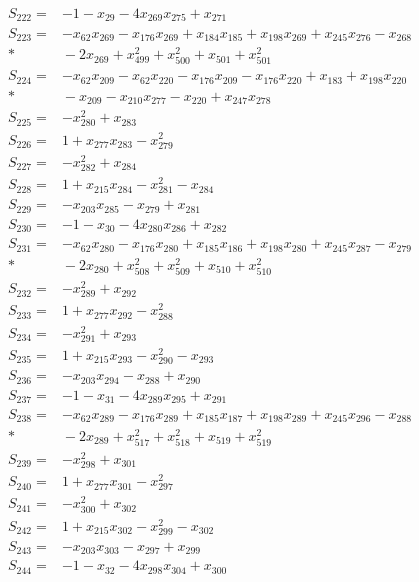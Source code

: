 \begin{align*}
S_{222}={}&-1-x_{29}-4x_{269}x_{275}+x_{271}\\[3pt]
S_{223}={}&-x_{62}x_{269}-x_{176}x_{269}+x_{184}x_{185}+x_{198}x_{269}+x_{245}x_{276}-x_{268}\\*
&{}-2x_{269}+x_{499}^{2}+x_{500}^{2}+x_{501}+x_{501}^{2}\\[3pt]
S_{224}={}&-x_{62}x_{209}-x_{62}x_{220}-x_{176}x_{209}-x_{176}x_{220}+x_{183}+x_{198}x_{220}\\*
&{}-x_{209}-x_{210}x_{277}-x_{220}+x_{247}x_{278}\\[3pt]
S_{225}={}&-x_{280}^{2}+x_{283}\\[3pt]
S_{226}={}&1+x_{277}x_{283}-x_{279}^{2}\\[3pt]
S_{227}={}&-x_{282}^{2}+x_{284}\\[3pt]
S_{228}={}&1+x_{215}x_{284}-x_{281}^{2}-x_{284}\\[3pt]
S_{229}={}&-x_{203}x_{285}-x_{279}+x_{281}\\[3pt]
S_{230}={}&-1-x_{30}-4x_{280}x_{286}+x_{282}\\[3pt]
S_{231}={}&-x_{62}x_{280}-x_{176}x_{280}+x_{185}x_{186}+x_{198}x_{280}+x_{245}x_{287}-x_{279}\\*
&{}-2x_{280}+x_{508}^{2}+x_{509}^{2}+x_{510}+x_{510}^{2}\\[3pt]
S_{232}={}&-x_{289}^{2}+x_{292}\\[3pt]
S_{233}={}&1+x_{277}x_{292}-x_{288}^{2}\\[3pt]
S_{234}={}&-x_{291}^{2}+x_{293}\\[3pt]
S_{235}={}&1+x_{215}x_{293}-x_{290}^{2}-x_{293}\\[3pt]
S_{236}={}&-x_{203}x_{294}-x_{288}+x_{290}\\[3pt]
S_{237}={}&-1-x_{31}-4x_{289}x_{295}+x_{291}\\[3pt]
S_{238}={}&-x_{62}x_{289}-x_{176}x_{289}+x_{185}x_{187}+x_{198}x_{289}+x_{245}x_{296}-x_{288}\\*
&{}-2x_{289}+x_{517}^{2}+x_{518}^{2}+x_{519}+x_{519}^{2}\\[3pt]
S_{239}={}&-x_{298}^{2}+x_{301}\\[3pt]
S_{240}={}&1+x_{277}x_{301}-x_{297}^{2}\\[3pt]
S_{241}={}&-x_{300}^{2}+x_{302}\\[3pt]
S_{242}={}&1+x_{215}x_{302}-x_{299}^{2}-x_{302}\\[3pt]
S_{243}={}&-x_{203}x_{303}-x_{297}+x_{299}\\[3pt]
S_{244}={}&-1-x_{32}-4x_{298}x_{304}+x_{300}\\[3pt]

\end{align*}
